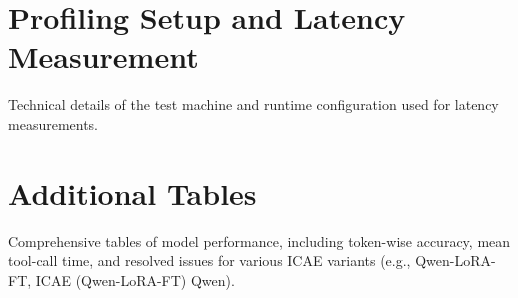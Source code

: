 \section{Profiling Setup and Latency Measurement}

Technical details of the test machine and runtime configuration used for latency measurements.


\section{Additional Tables}

Comprehensive tables of model performance, including token-wise accuracy, mean tool-call time, and resolved issues for various ICAE \cite{ge_-context_2024} variants (e.g., Qwen-LoRA-FT, ICAE (Qwen-LoRA-FT) Qwen).
